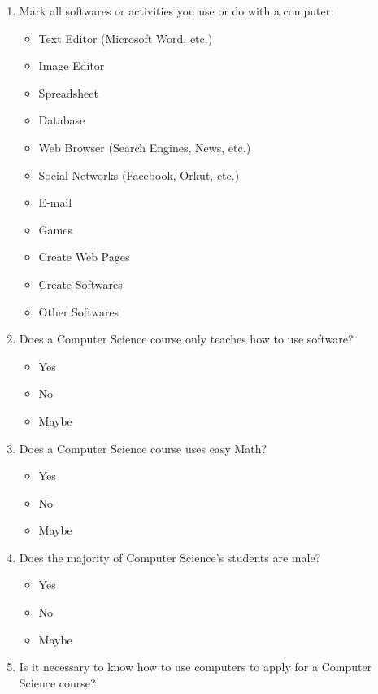 \begin{enumerate}
\begin{itemize}
        \end{itemize}
    \item Mark all softwares or activities you use or do with  a computer:
        \begin{itemize}
            \item Text Editor (Microsoft Word, etc.)
            \item Image Editor
            \item Spreadsheet
            \item Database
            \item Web Browser (Search Engines, News, etc.)
            \item Social Networks (Facebook, Orkut, etc.)
            \item E-mail
            \item Games
            \item Create Web Pages
            \item Create Softwares
            \item Other Softwares
        \end{itemize}
    \item Does a Computer Science course only teaches how to use software?
        \begin{itemize}
            \item Yes
            \item No
            \item Maybe
        \end{itemize}
    \item Does a Computer Science course uses easy Math?
        \begin{itemize}
            \item Yes
            \item No
            \item Maybe
        \end{itemize}    
    \item Does the majority of Computer Science's students are male?
        \begin{itemize}
            \item Yes
            \item No
            \item Maybe
        \end{itemize}
    \item Is it necessary to know how to use computers to apply for a Computer Science course?
        \begin{itemize}

\end{itemize}
\end{enumerate}
